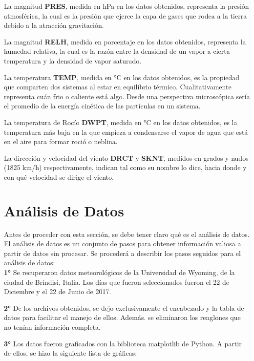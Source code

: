 \documentclass[a4paper]{article}
\begin{document}
La magnitud \textbf{PRES}, medida en hPa en los datos obtenidos, representa la presión atmosférica, la cual es la presión que ejerce la capa de gases que rodea a la tierra debido a la atracción gravitación.

La magnitud \textbf{RELH}, medida en porcentaje en los datos obtenidos, representa la humedad relativa, la cual es la razón entre la densidad de un vapor a cierta temperatura y la densidad de vapor saturado.

La temperatura \textbf{TEMP}, medida en °C en los datos obtenidos, es la propiedad que comparten dos sistemas al estar en equilibrio térmico. Cualitativamente representa cuán frio o caliente está algo.  Desde una perspectiva microscópica sería el promedio de la energía cinética de las partículas en un sistema. 

La temperatura de Rocío \textbf{DWPT}, medida en °C en los datos obtenidos, es la temperatura más baja en la que empieza a condensarse el vapor de agua que está en el aire para formar roció o neblina.

La dirección y velocidad del viento \textbf{DRCT} y \textbf{SKNT}, medidos en grados y nudos (1825 km/h) respectivamente, indican tal como su nombre lo dice, hacia donde y con qué velocidad se dirige el viento.  

\section{Análisis de Datos}

Antes de proceder con esta sección, se debe tener claro qué es el análisis de datos. El análisis de datos es un conjunto de pasos para obtener información valiosa a partir de datos sin procesar. Se procederá a describir los pasos seguidos para el análisis de datos: \\

\textbf{1°} Se recuperaron datos meteorológicos de la Universidad de Wyoming, de la ciudad de Brindisi, Italia. Los días que fueron seleccionados fueron el 22 de Diciembre y el 22 de Junio de 2017.

\textbf{2°} De los archivos obtenidos, se dejo exclusivamente el encabezado y la tabla de datos para facilitar el manejo de ellos. Además. se eliminaron los renglones que no tenían información completa. 

\textbf{3°} Los datos fueron graficados con la biblioteca matplotlib de Python. A partir de ellos, se hizo la siguiente lista de gráficas:
\end{document}
